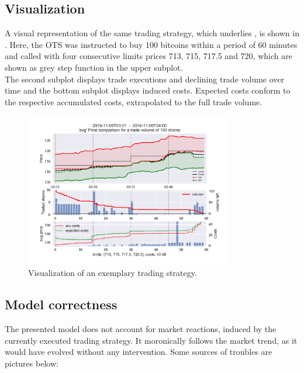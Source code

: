 \subsection{Visualization}
A visual representation of the same trading strategy, which underlies , is shown in . Here, the \ac{OTS} was instructed to buy 100 bitcoins within a period of 60 minutes and called with four consecutive limits prices 713, 715, 717.5 and 720, which are shown as grey step function in the upper subplot.\\

The second subplot displays trade executions and declining trade volume over time and the bottom subplot displays induced costs. Expected costs conform to the respective accumulated costs, extrapolated to the full trade volume.

\begin{figure}[ht]
	\centering
   \includegraphics[width=0.8\textwidth]{content/drawings/trading_example17_good}
	\caption{Visualization of an exemplary trading strategy.}
	\label{fig:tradingstrategy17good}
\end{figure}

\subsection{Model correctness}
\label{chap:modelcorrectness}
The presented model does not account for market reactions, induced by the currently executed trading strategy. It moronically follows the market trend, as it would have evolved without any intervention. Some sources of troubles are pictures below:

